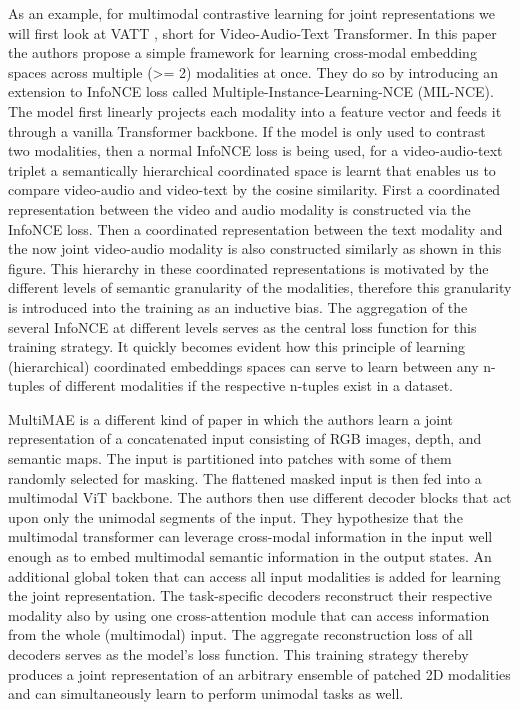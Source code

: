 \documentclass[
]{krantz}
\begin{document}
As an example, for multimodal contrastive learning for joint representations we will first look at VATT \citep{DBLP:conf/nips/AkbariYQCCCG21}, short for Video-Audio-Text Transformer. In this paper the authors propose a simple framework for learning cross-modal embedding spaces across multiple (\textgreater= 2) modalities at once. They do so by introducing an extension to InfoNCE loss called Multiple-Instance-Learning-NCE (MIL-NCE). The model first linearly projects each modality into a feature vector and feeds it through a vanilla Transformer backbone. If the model is only used to contrast two modalities, then a normal InfoNCE loss is being used, for a video-audio-text triplet a semantically hierarchical coordinated space is learnt that enables us to compare video-audio and video-text by the cosine similarity. First a coordinated representation between the video and audio modality is constructed via the InfoNCE \citep{DBLP:conf/icml/ChenK0H20} loss. Then a coordinated representation between the text modality and the now joint video-audio modality is also constructed similarly as shown in this figure. This hierarchy in these coordinated representations is motivated by the different levels of semantic granularity of the modalities, therefore this granularity is introduced into the training as an inductive bias. The aggregation of the several InfoNCE at different levels serves as the central loss function for this training strategy. It quickly becomes evident how this principle of learning (hierarchical) coordinated embeddings spaces can serve to learn between any n-tuples of different modalities if the respective n-tuples exist in a dataset.

MultiMAE \citep{bachmann2022multimae} is a different kind of paper in which the authors learn a joint representation of a concatenated input consisting of RGB images, depth, and semantic maps. The input is partitioned into patches with some of them randomly selected for masking. The flattened masked input is then fed into a multimodal ViT \citep{DBLP:conf/iclr/DosovitskiyB0WZ21} backbone. The authors then use different decoder blocks that act upon only the unimodal segments of the input. They hypothesize that the multimodal transformer can leverage cross-modal information in the input well enough as to embed multimodal semantic information in the output states. An additional global token that can access all input modalities is added for learning the joint representation. The task-specific decoders reconstruct their respective modality also by using one cross-attention module that can access information from the whole (multimodal) input. The aggregate reconstruction loss of all decoders serves as the model's loss function. This training strategy thereby produces a joint representation of an arbitrary ensemble of patched 2D modalities and can simultaneously learn to perform unimodal tasks as well.
\end{document}
